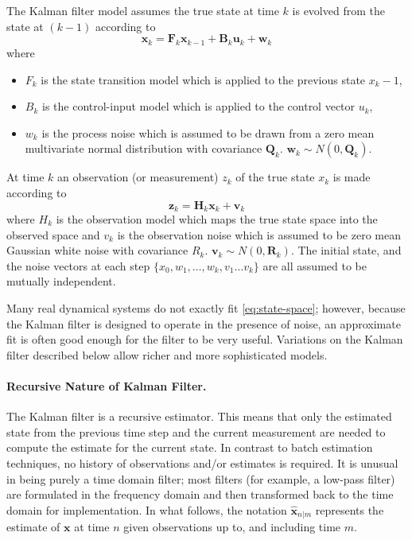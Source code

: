The Kalman filter model assumes the true state at time $k$ is evolved from the state at $(k - 1)$ according to
\begin{equation}
\textbf{x}_{k} = \textbf{F}_{k} \textbf{x}_{k-1} + \textbf{B}_{k} \textbf{u}_{k} + \textbf{w}_{k}
\label{eq:state-space}
\end{equation}
where
\begin{itemize}
\item $F_k$ is the state transition model which is applied to the previous state $x_k-1$,
\item $B_k$ is the control-input model which is applied to the control vector $u_k$,
\item $w_k$ is the process noise which is assumed to be drawn from a zero mean multivariate normal distribution with covariance $\mathbf{Q}_k$. $\textbf{w}_{k} \sim N(0, \textbf{Q}_k)$.
\end{itemize}

At time $k$ an observation (or measurement) $z_k$ of the true state $x_k$ is made according to
\[
\textbf{z}_{k} = \textbf{H}_{k} \textbf{x}_{k} + \textbf{v}_{k}
\]
where $H_k$ is the observation model which maps the true state space into the observed space and $v_k$ is the observation noise which is assumed to be zero mean Gaussian white noise with covariance $R_k$. $\textbf{v}_{k} \sim N(0, \textbf{R}_k)$. The initial state, and the noise vectors at each step $\{x_0, w_1, \ldots, w_k, v_1 \ldots v_k\}$ are all assumed to be mutually independent.

Many real dynamical systems do not exactly fit \eqref{eq:state-space}; however, because the Kalman filter is designed to operate in the presence of noise, an approximate fit is often good enough for the filter to be very useful. Variations on the Kalman filter described below allow richer and more sophisticated models.

\paragraph{Recursive Nature of Kalman Filter.}
The Kalman filter is a recursive estimator. This means that only the estimated state from the previous time step and the current measurement are needed to compute the estimate for the current state. In contrast to batch estimation techniques, no history of observations and/or estimates is required. It is unusual in being purely a time domain filter; most filters (for example, a low-pass filter) are formulated in the frequency domain and then transformed back to the time domain for implementation. In what follows, the notation $\hat{\textbf{x}}_{n|m}$ represents the estimate of $\textbf{x}$ at time $n$ given observations up to, and including time $m$.

